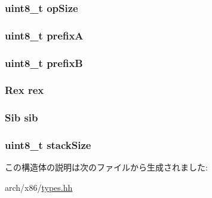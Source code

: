 \hypertarget{structX86ISA_1_1ExtMachInst_ad3cabad3e6f648d2da97051c2b37229b}{
\subsubsection[{opSize}]{\setlength{\rightskip}{0pt plus 5cm}uint8\_\-t {\bf opSize}}}
\label{structX86ISA_1_1ExtMachInst_ad3cabad3e6f648d2da97051c2b37229b}
\hypertarget{structX86ISA_1_1ExtMachInst_afde55dd36a94f53ae11872b4a09f8c6f}{
\subsubsection[{prefixA}]{\setlength{\rightskip}{0pt plus 5cm}uint8\_\-t {\bf prefixA}}}
\label{structX86ISA_1_1ExtMachInst_afde55dd36a94f53ae11872b4a09f8c6f}
\hypertarget{structX86ISA_1_1ExtMachInst_ab63c1254b3154aac44b912410132e1d8}{
\subsubsection[{prefixB}]{\setlength{\rightskip}{0pt plus 5cm}uint8\_\-t {\bf prefixB}}}
\label{structX86ISA_1_1ExtMachInst_ab63c1254b3154aac44b912410132e1d8}
\hypertarget{structX86ISA_1_1ExtMachInst_aa92db536231767bdd06da2405c873fa5}{
\subsubsection[{rex}]{\setlength{\rightskip}{0pt plus 5cm}Rex {\bf rex}}}
\label{structX86ISA_1_1ExtMachInst_aa92db536231767bdd06da2405c873fa5}
\hypertarget{structX86ISA_1_1ExtMachInst_ad4324932256063057593479e8749451a}{
\subsubsection[{sib}]{\setlength{\rightskip}{0pt plus 5cm}Sib {\bf sib}}}
\label{structX86ISA_1_1ExtMachInst_ad4324932256063057593479e8749451a}
\hypertarget{structX86ISA_1_1ExtMachInst_aa9ff7192e7079f61c1cea13a63565361}{
\subsubsection[{stackSize}]{\setlength{\rightskip}{0pt plus 5cm}uint8\_\-t {\bf stackSize}}}
\label{structX86ISA_1_1ExtMachInst_aa9ff7192e7079f61c1cea13a63565361}


この構造体の説明は次のファイルから生成されました:\begin{DoxyCompactItemize}
\item 
arch/x86/\hyperlink{arch_2x86_2types_8hh}{types.hh}\end{DoxyCompactItemize}
